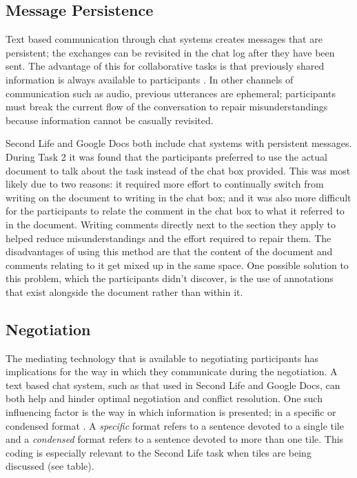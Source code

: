 \documentclass{acm_proc_article-sp}
\begin{document}
\subsection{Message Persistence}

Text based communication through chat systems creates messages that are persistent; the exchanges can be revisited in the chat log after they have been sent. The advantage of this for collaborative tasks is that previously shared information is always available to participants \cite{halversonwhat2003}. In other channels of communication such as audio, previous utterances are ephemeral; participants must break the current flow of the conversation to repair misunderstandings because information cannot be casually revisited.

Second Life and Google Docs both include chat systems with persistent messages. During Task 2 it was found that the participants preferred to use the actual document to talk about the task instead of the chat box provided. This was most likely due to two reasons: it required more effort to continually switch from writing on the document to writing in the chat box; and it was also more difficult for the participants to relate the comment in the chat box to what it referred to in the document. Writing comments directly next to the section they apply to helped reduce misunderstandings and the effort required to repair them. The disadvantages of using this method are that the content of the document and comments relating to it get mixed up in the same space. One possible solution to this problem, which the participants didn't discover, is the use of annotations that exist alongside the document rather than within it.

\subsection{Negotiation}

The mediating technology that is available to negotiating participants has implications for the way in which they communicate during the negotiation. A text based chat system, such as that used in Second Life and Google Docs, can both help and hinder optimal negotiation and conflict resolution. One such influencing factor is the way in which information is presented; in a specific or condensed format \cite{dongone2012}. A \emph{specific} format refers to a sentence devoted to a single tile and a \emph{condensed} format refers to a sentence devoted to more than one tile. This coding is especially relevant to the Second Life task when tiles are being discussed (see table).
\end{document}

